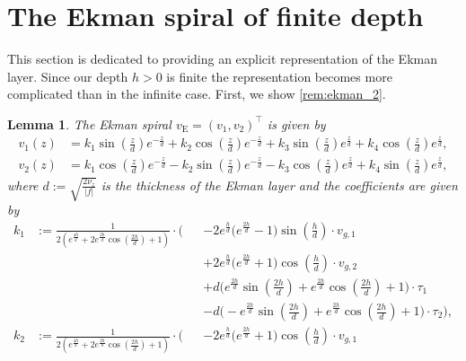 \documentclass[preprint]{elsarticle}
\newtheorem{lem}[lem]{Lemma}
\numberwithin{equation}{section}
\newcommand{\rE}{\mathrm{E}}
\begin{document}

\appendix

\section{The Ekman spiral of finite depth}
\label{sec:ekman explicit_2}

This section is dedicated to providing an explicit representation of the Ekman layer. Since our depth $h >0$ is finite the representation becomes more complicated than in the infinite case. 
First, we show \autoref{rem:ekman_2}. 

\begin{lem}\label{lem:representation ekman_2}
	The Ekman spiral $v_{\rE} = (v_1,v_2)^\top$ is given by
	\begin{align*}
		v_1(z)
		&= k_1 \sin(\tfrac{z}{d}) e^{-\tfrac{z}{d}}
		+ k_2 \cos(\tfrac{z}{d}) e^{-\tfrac{z}{d}}
		+ k_3 \sin(\tfrac{z}{d}) e^{\tfrac{z}{d}}
		+ k_4 \cos(\tfrac{z}{d}) e^{\tfrac{z}{d}}, \\
		v_2(z)
		&=
		k_1 \cos (\tfrac{z}{d}) e^{-\tfrac{z}{d}}
		- k_2 \sin (\tfrac{z}{d}) e^{-\tfrac{z}{d}}
		- k_3 \cos (\tfrac{z}{d}) e^{\tfrac{z}{d}}
		+ k_4 \sin (\tfrac{z}{d}) e^{\tfrac{z}{d}},
	\end{align*}
	where $d := \sqrt{\frac{2 \nu_z}{|f|}}$ is the thickness of the Ekman layer and 
	the coefficients are given by
	\begin{equation}
		\begin{aligned}
			k_1 &:=	
			\frac{1}{2 \left(e^{\tfrac{4 h}{d}}+2 e^{\tfrac{2 h}{d}} \cos (\tfrac{2 h}{d})+1\right)}
			\cdot 
			\biggl( &&-2 e^{\tfrac{h}{d}} \bigl(e^{\frac{2 h}{d}}-1\bigr) \sin (\tfrac{h}{d})\cdot v_{g,1} \\
			& &&+2 e^{\tfrac{h}{d}} \bigl(e^{\tfrac{2 h}{d}}+1\bigr) \cos (\tfrac{h}{d}) \cdot v_{g,2}
			\\
			& &&+d \bigl(e^{\frac{2 h}{d}} \sin (\tfrac{2 h}{d})+e^{\tfrac{2 h}{d}} \cos (\tfrac{2 h}{d})+1\bigr) \cdot \tau_1 \\
			& &&-d \bigl(-e^{\tfrac{2 h}{d}} \sin (\tfrac{2 h}{d})+e^{\tfrac{2 h}{d}} \cos (\tfrac{2 h}{d})+1\bigr) \cdot \tau_2\biggr) , \\
			k_2 &:=	
			\frac{1}{2 \left(e^{\tfrac{4 h}{d}}+2 e^{\tfrac{2 h}{d}} \cos (\tfrac{2 h}{d})+1\right)}
			\cdot 
			\biggl(
			&&  -2 e^{\tfrac{h}{d}} \bigl(e^{\tfrac{2 h}{d}}+1\bigr) \cos (\tfrac{h}{d}) \cdot v_{g,1} \\

\end{aligned}
\end{equation}
\end{lem}
\end{document}
